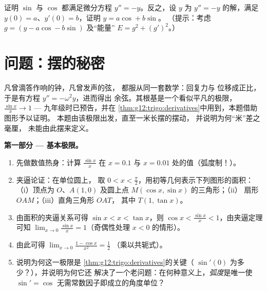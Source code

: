 \begin{exercise}[$\star\star\star$]\label{exo:g12:trigo:9}
证明 $\sin$ 与 $\cos$ 都满足微分方程
$y'' = -y$。反之，设 $y$ 为 $y'' = -y$ 的解，满足
$y(0) = a$、$y'(0) = b$，证明 $y = a\cos + b\sin$。
（提示：考虑 $g = (y - a\cos - b\sin)$ 及“能量”
$E = g^2 + (g')^2$。）
\end{exercise}

\section{问题：摆的秘密}

\begin{problem}
\label{pb:g12:trigo:1}
凡曾滴答作响的钟，凡曾发声的弦，
都服从同一套数学：回复力与
位移成正比，于是有方程 $y'' = -\omega^2 y$，进而得出
余弦。其根基是一个看似平凡的极限，
$\frac{\sin x}{x} \to 1$ --- 九年级时已预告，并在
\cref{thm:g12:trigo:derivatives}中用到，本题借助图形予以证明。
本题由该极限出发，直至一米长摆的摆动，
并说明为何“米”差之毫厘，
未能由此摆来定义。

\medskip
\noindent\textbf{第一部分 --- 基本极限。}
\begin{enumerate}
  \item 先做数值热身：计算 $\frac{\sin x}{x}$ 在
        $x = 0.1$ 与 $x = 0.01$ 处的值（弧度制！）。
  \item 夹逼论证：在单位圆上，
        取 $0 < x < \frac\pi2$，用初等几何表示下列图形的面积：
        （i）顶点为 $O$、$A(1,0)$
        及圆上点 $M(\cos x, \sin x)$ 的三角形；（ii）
        扇形 $OAM$；（iii）直角三角形 $OAT$，
        其中 $T(1, \tan x)$。
  \item 由面积的夹逼关系可得
        $\sin x < x < \tan x$，则
        $\cos x < \frac{\sin x}{x} < 1$，由夹逼定理
        可知
        $\lim_{x \to 0} \frac{\sin x}{x} = 1$（奇偶性处理
        $x < 0$ 的情形）。
  \item 由此可得
        $\lim_{x \to 0} \frac{1 - \cos x}{x^2} = \frac12$
        （乘以共轭式）。
  \item 说明为何这一极限是
        \cref{thm:g12:trigo:derivatives}的关键（
        $\sin'(0)$ 为多少？），并说明为何它还
        解决了一个老问题：在何种意义上，\emph{弧度}是唯一使
        $\sin' = \cos$ 无需常数因子即成立的角度单位？
\end{enumerate}


\end{problem}
